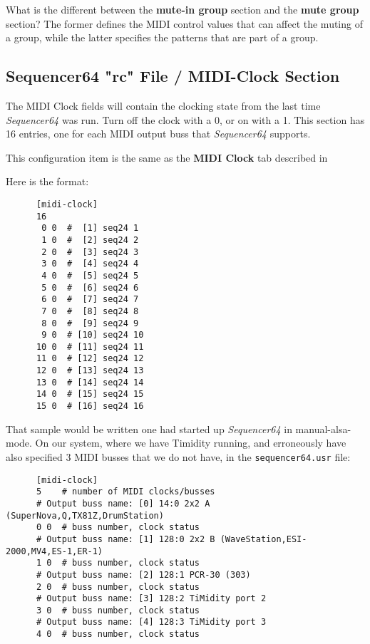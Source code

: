    What is the different between the \textbf{mute-in group}
   section and the \textbf{mute group} section?  The former defines the MIDI
   control values that can affect the muting of a group, while the latter
   specifies the patterns that are part of a group.

\subsection{Sequencer64 "rc" File / MIDI-Clock Section}
\label{subsec:seq64_rc_file_midi_clock}

   The MIDI Clock fields will contain the clocking state from the last 
   time \textsl{Sequencer64} was run.  Turn off the clock with a 0, or on
   with a 1.
   This section has 16 entries, one for each MIDI output buss that
   \textsl{Sequencer64} supports.

   This configuration item is the same as the 
   \textbf{MIDI Clock} tab described in
   
   Here is the format:

   \begin{verbatim}
      [midi-clock]
      16
       0 0  #  [1] seq24 1
       1 0  #  [2] seq24 2
       2 0  #  [3] seq24 3
       3 0  #  [4] seq24 4
       4 0  #  [5] seq24 5
       5 0  #  [6] seq24 6
       6 0  #  [7] seq24 7
       7 0  #  [8] seq24 8
       8 0  #  [9] seq24 9
       9 0  # [10] seq24 10
      10 0  # [11] seq24 11
      11 0  # [12] seq24 12
      12 0  # [13] seq24 13
      13 0  # [14] seq24 14
      14 0  # [15] seq24 15
      15 0  # [16] seq24 16
   \end{verbatim}

   That sample would be written one had started up \textsl{Sequencer64} in
   manual-alsa-mode.  On our system, where we have Timidity running, and
   erroneously have also specified 3 MIDI busses that we do not have, in the
   \texttt{sequencer64.usr} file:

   \begin{verbatim}
      [midi-clock]
      5    # number of MIDI clocks/busses
      # Output buss name: [0] 14:0 2x2 A (SuperNova,Q,TX81Z,DrumStation)
      0 0  # buss number, clock status
      # Output buss name: [1] 128:0 2x2 B (WaveStation,ESI-2000,MV4,ES-1,ER-1)
      1 0  # buss number, clock status
      # Output buss name: [2] 128:1 PCR-30 (303)
      2 0  # buss number, clock status
      # Output buss name: [3] 128:2 TiMidity port 2
      3 0  # buss number, clock status
      # Output buss name: [4] 128:3 TiMidity port 3
      4 0  # buss number, clock status
   \end{verbatim}

